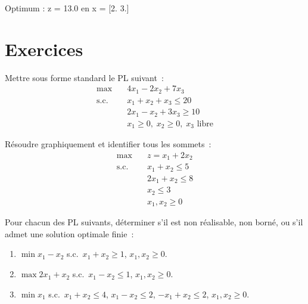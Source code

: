 \begin{codeoutput}
Optimum : z = 13.0 en x = [2. 3.]
\end{codeoutput}

\section{Exercices}

\begin{exercice}
Mettre sous forme standard le PL suivant~:
\[
\begin{aligned}
  \max \quad & 4x_1 - 2x_2 + 7x_3 \\
  \text{s.c.} \quad
    & x_1 + x_2 + x_3 \le 20 \\
    & 2x_1 - x_2 + 3x_3 \ge 10 \\
    & x_1 \ge 0,\; x_2 \ge 0,\; x_3 \text{ libre}
\end{aligned}
\]
\end{exercice}

\begin{exercice}
R\'esoudre graphiquement et identifier tous les sommets~:
\[
\begin{aligned}
  \max \quad & z = x_1 + 2x_2 \\
  \text{s.c.} \quad
    & x_1 + x_2 \le 5 \\
    & 2x_1 + x_2 \le 8 \\
    & x_2 \le 3 \\
    & x_1, x_2 \ge 0
\end{aligned}
\]
\end{exercice}

\begin{exercice}
Pour chacun des PL suivants, d\'eterminer s'il est non r\'ealisable, non born\'e,
ou s'il admet une solution optimale finie~:
\begin{enumerate}
  \item $\min x_1 - x_2$ s.c.\ $x_1 + x_2 \ge 1$, $x_1, x_2 \ge 0$.
  \item $\max 2x_1 + x_2$ s.c.\ $x_1 - x_2 \le 1$, $x_1, x_2 \ge 0$.
  \item $\min x_1$ s.c.\ $x_1 + x_2 \le 4$, $x_1 - x_2 \le 2$,
        $-x_1 + x_2 \le 2$, $x_1, x_2 \ge 0$.
\end{enumerate}
\end{exercice}

